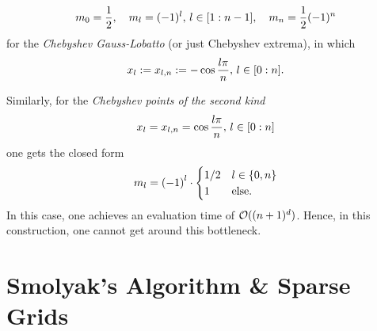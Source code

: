 \documentclass[12pt, oneside]{amsart}
\theoremstyle{definition}
\theoremstyle{remark}
\numberwithin{equation}{section}
\begin{document}
\begin{equation}\label{barycentric_weights_chebyshev}
    m_{0} = \frac{1}{2},\quad m_{l} = (-1)^l,\, l \in \indexset[1]{n-1},\quad m_n = \frac{1}{2}(-1)^n
\end{equation}
for the \emph{Chebyshev Gauss-Lobatto} (or just Chebyshev extrema), in which \begin{equation}\label{ChebyshevGaussLobatto}
    x_l \defn x_{l,n} \defn - \cos\frac{l \pi}{n},\, l \in \indexset[0]{n}.
\end{equation}

Similarly, for the \emph{Chebyshev points of the second kind}
\begin{equation}\label{eq:chebyPts2}
    x_l = x_{l, n} = \cos \frac{l \pi}{n},\, l \in \indexset[0]{n}
\end{equation}
one gets the closed form
\begin{equation}\label{eq:weightsChebyshev}
    m_l = {\left(-1\right)}^l \cdot \begin{cases}
        1/2 &l \in \set{0, n}\\
        1 &\text{else.}
    \end{cases}
\end{equation}
In this case, one achieves an evaluation time of \(\cO((n+1)^d)\).
Hence, in this construction, one cannot get around this bottleneck. 


\section{Smolyak's Algorithm \& Sparse Grids}
\end{document}
